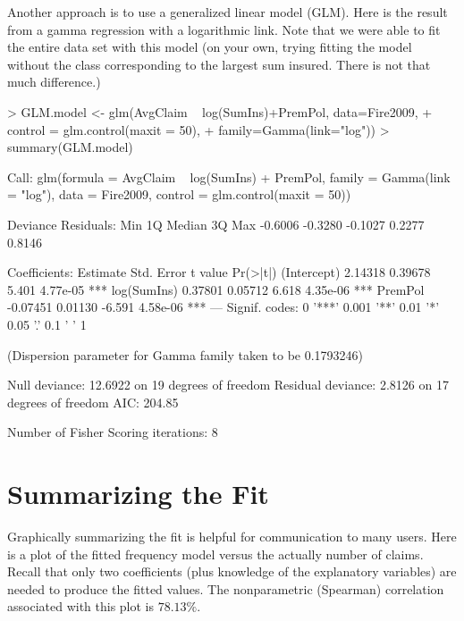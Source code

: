 \documentclass[12pt,letterpaper]{article}
\begin{document}
\newpage
Another approach is to use a generalized linear model (GLM). 
Here is the result from a gamma regression with a logarithmic link.
Note that we were able to fit the entire data set with this model
(on your own, trying fitting the model without the class corresponding to the largest
sum insured. There is not that much difference.)

\begin{Schunk}
\begin{Sinput}
> GLM.model <- glm(AvgClaim ~ log(SumIns)+PremPol, data=Fire2009,    
+       control = glm.control(maxit = 50), 
+     family=Gamma(link="log"))      
> summary(GLM.model)
\end{Sinput}
\begin{Soutput}
Call:
glm(formula = AvgClaim ~ log(SumIns) + PremPol, family = Gamma(link = "log"), 
    data = Fire2009, control = glm.control(maxit = 50))

Deviance Residuals: 
    Min       1Q   Median       3Q      Max  
-0.6006  -0.3280  -0.1027   0.2277   0.8146  

Coefficients:
            Estimate Std. Error t value Pr(>|t|)    
(Intercept)  2.14318    0.39678   5.401 4.77e-05 ***
log(SumIns)  0.37801    0.05712   6.618 4.35e-06 ***
PremPol     -0.07451    0.01130  -6.591 4.58e-06 ***
---
Signif. codes:  0 '***' 0.001 '**' 0.01 '*' 0.05 '.' 0.1 ' ' 1

(Dispersion parameter for Gamma family taken to be 0.1793246)

    Null deviance: 12.6922  on 19  degrees of freedom
Residual deviance:  2.8126  on 17  degrees of freedom
AIC: 204.85

Number of Fisher Scoring iterations: 8
\end{Soutput}
\end{Schunk}

\newpage

\section{Summarizing the Fit}

Graphically summarizing the fit is helpful for communication to many users. 
Here is a plot of the fitted frequency model versus the actually number of claims.
Recall that only two coefficients (plus knowledge of the explanatory variables) are needed
to produce the fitted values. The nonparametric (Spearman) correlation associated with
this plot is $78.13\%$.
\end{document}
